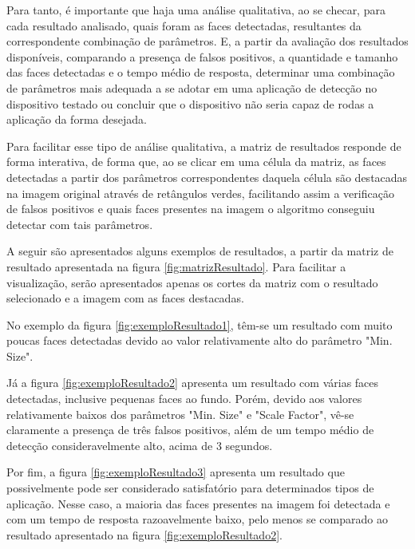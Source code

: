 Para tanto, é importante que haja uma análise qualitativa, ao se checar, para cada resultado analisado, quais foram as faces detectadas, resultantes da correspondente combinação de parâmetros. E, a partir da avaliação dos resultados disponíveis, comparando a presença de falsos positivos, a quantidade e tamanho das faces detectadas e o tempo médio de resposta, determinar uma combinação de parâmetros mais adequada a se adotar em uma aplicação de detecção no dispositivo testado ou concluir que o dispositivo não seria capaz de rodas a aplicação da forma desejada.

Para facilitar esse tipo de análise qualitativa, a matriz de resultados responde de forma interativa, de forma que, ao se clicar em uma célula da matriz, as faces detectadas a partir dos parâmetros correspondentes daquela célula são destacadas na imagem original através de retângulos verdes, facilitando assim a verificação de falsos positivos e quais faces presentes na imagem o algoritmo conseguiu detectar com tais parâmetros.

A seguir são apresentados alguns exemplos de resultados, a partir da matriz de resultado apresentada na figura \ref{fig:matrizResultado}. Para facilitar a visualização, serão apresentados apenas os cortes da matriz com o resultado selecionado e a imagem com as faces destacadas.

No exemplo da figura \ref{fig:exemploResultado1}, têm-se um resultado com muito poucas faces detectadas devido ao valor relativamente alto do parâmetro "Min. Size".

Já a figura \ref{fig:exemploResultado2} apresenta um resultado com várias faces detectadas, inclusive pequenas faces ao fundo. Porém, devido aos valores relativamente baixos dos parâmetros "Min. Size" e "Scale Factor", vê-se claramente a presença de três falsos positivos, além de um tempo médio de detecção consideravelmente alto, acima de 3 segundos.

Por fim, a figura \ref{fig:exemploResultado3} apresenta um resultado que possivelmente pode ser considerado satisfatório para determinados tipos de aplicação. Nesse caso, a maioria das faces presentes na imagem foi detectada e com um tempo de resposta razoavelmente baixo, pelo menos se comparado ao resultado apresentado na figura \ref{fig:exemploResultado2}.

